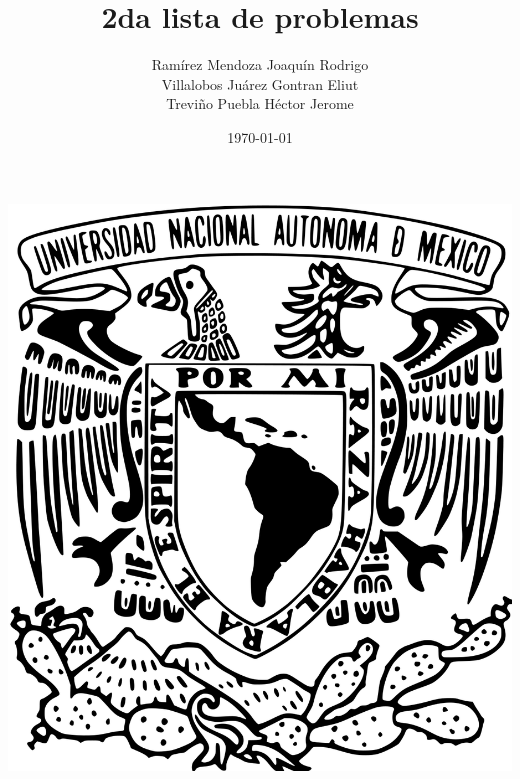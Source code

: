 \documentclass[oneside]{book}
\title{2da lista de problemas}
\author{Ramírez Mendoza Joaquín Rodrigo\\
Villalobos Juárez Gontran Eliut\\
Treviño Puebla Héctor Jerome}
\date{\today}
\begin{document}
\begin{titlepage}

	\begin{minipage}{3cm}
		\begin{center}
			\includegraphics[height = 0.14\textheight]{recursos/Logo_UNAM.png}\par
		\end{center}
	\end{minipage}\hfill
	\begin{minipage}{10cm}


\end{minipage}
\end{titlepage}
\end{document}
